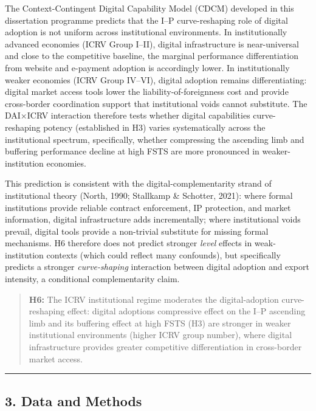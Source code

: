 \documentclass[12pt,a4paper]{article}
\begin{document}
The Context-Contingent Digital Capability Model (CDCM) developed in this
dissertation programme predicts that the I--P curve-reshaping role of
digital adoption is not uniform across institutional environments. In
institutionally advanced economies (ICRV Group I--II), digital
infrastructure is near-universal and close to the competitive baseline,
the marginal performance differentiation from website and e-payment
adoption is accordingly lower. In institutionally weaker economies (ICRV
Group IV--VI), digital adoption remains differentiating: digital market
access tools lower the liability-of-foreignness cost and provide
cross-border coordination support that institutional voids cannot
substitute. The DAI×ICRV interaction therefore tests whether digital
capabilities\textquotesingle{} curve-reshaping potency (established in
H3) varies systematically across the institutional spectrum,
specifically, whether compressing the ascending limb and buffering
performance decline at high FSTS are more pronounced in
weaker-institution economies.

This prediction is consistent with the digital-complementarity strand of
institutional theory (North, 1990; Stallkamp \& Schotter, 2021): where
formal institutions provide reliable contract enforcement, IP
protection, and market information, digital infrastructure adds
incrementally; where institutional voids prevail, digital tools provide
a non-trivial substitute for missing formal mechanisms. H6 therefore
does not predict stronger \emph{level} effects in weak-institution
contexts (which could reflect many confounds), but specifically predicts
a stronger \emph{curve-shaping} interaction between digital adoption and
export intensity, a conditional complementarity claim.

\begin{quote}
\textbf{H6:} The ICRV institutional regime moderates the
digital-adoption curve-reshaping effect: digital
adoption\textquotesingle s compressive effect on the I--P ascending limb
and its buffering effect at high FSTS (H3) are stronger in weaker
institutional environments (higher ICRV group number), where digital
infrastructure provides greater competitive differentiation in
cross-border market access.
\end{quote}

\begin{center}\rule{0.5\linewidth}{0.5pt}\end{center}

\hypertarget{3-data-and-methods}{%
\subsection{3. Data and Methods}\label{3-data-and-methods}}
\end{document}
